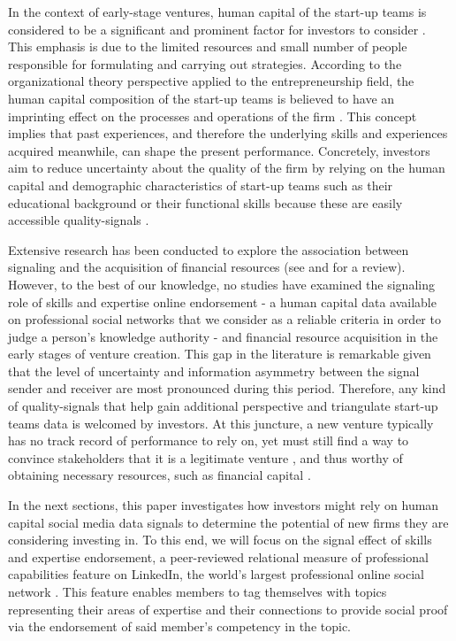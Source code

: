 \documentclass[12pt]{article}
\begin{document}
In the context of early-stage ventures, human capital of the start-up teams is considered to be a significant and prominent factor for investors to consider \citep{beckman2007early, ko2018signaling, matusik2008values}. This emphasis is due to the limited resources and small number of people responsible for formulating and carrying out strategies. According to the organizational theory perspective applied to the entrepreneurship field, the human capital composition of the start-up teams is believed to have an imprinting effect on the processes and operations of the firm \citep{packalen2007complementing}. This concept implies that past experiences, and therefore the underlying skills and experiences acquired meanwhile, can shape the present performance. Concretely, investors aim to reduce uncertainty about the quality of the firm by relying on the human capital and demographic characteristics of start-up teams such as their educational background or their functional skills because these are easily accessible quality-signals \citep{colombo2005founders, beckman2007early, eddleston2016you, plummer2016better}.

Extensive research has been conducted to explore the association between signaling and the acquisition of financial resources (see \citep{connelly2011signaling} and \citet{colombo2021use} for a review). However, to the best of our knowledge, no studies have examined the signaling role of skills and expertise online endorsement - a human capital data available on professional social networks that we consider as a reliable criteria in order to judge a person’s knowledge authority \citep{rapanta2017linkedin} - and financial resource acquisition in the early stages of venture creation. This gap in the literature is remarkable given that the level of uncertainty \citep{matusik2008values} and information asymmetry between the signal sender and receiver \citep{spence2002signaling} are most pronounced during this period. Therefore, any kind of quality-signals that help gain additional perspective and triangulate start-up teams data is welcomed by investors. At this juncture, a new venture typically has no track record of performance to rely on, yet must still find a way to convince stakeholders that it is a legitimate venture \citep{becker2015new}, and thus worthy of obtaining necessary resources, such as financial capital \citep{ko2018signaling}.

In the next sections, this paper investigates how investors might rely on human capital social media data signals to determine the potential of new firms they are considering investing in. To this end, we will focus on the signal effect of skills and expertise endorsement, a peer-reviewed relational measure of professional capabilities feature on LinkedIn, the world's largest professional online social network \citep{wu2018analysis}. This feature enables members to tag themselves with topics representing their areas of expertise and their connections to provide social proof via the endorsement of said member's competency in the topic.
\end{document}
